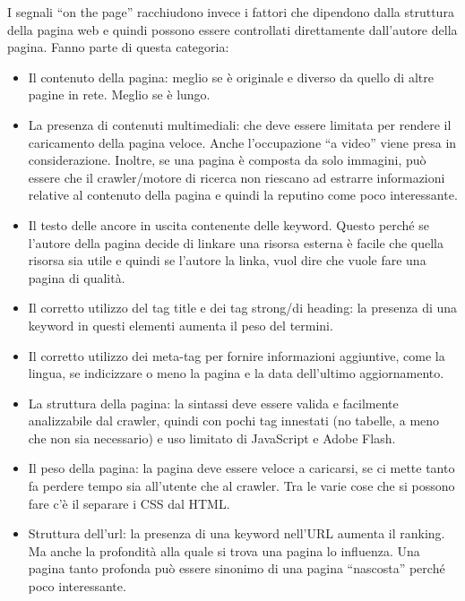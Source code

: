 I segnali ``on the page'' racchiudono invece i fattori che dipendono dalla struttura della pagina web e quindi possono essere controllati direttamente dall'autore della pagina.
Fanno parte di questa categoria:

\begin{itemize}
	\item Il contenuto della pagina: meglio se è originale e diverso da quello di altre pagine in rete. Meglio se è lungo.
	\item La presenza di contenuti multimediali: che deve essere limitata per rendere il caricamento della pagina veloce. Anche l'occupazione ``a video'' viene presa in considerazione. Inoltre, se una pagina è composta da solo immagini, può essere che il crawler/motore di ricerca non riescano ad estrarre informazioni relative al contenuto della pagina e quindi la reputino come poco interessante.
	\item Il testo delle ancore in uscita contenente delle keyword. Questo perché se l'autore della pagina decide di linkare una risorsa esterna è facile che quella risorsa sia utile e quindi se l'autore la linka, vuol dire che vuole fare una pagina di qualità.
	\item Il corretto utilizzo del tag title e dei tag strong/di heading: la presenza di una keyword in questi elementi aumenta il peso del termini.
	\item Il corretto utilizzo dei meta-tag per fornire informazioni aggiuntive, come la lingua, se indicizzare o meno la pagina e la data dell'ultimo aggiornamento.
	\item La struttura della pagina: la sintassi deve essere valida e facilmente analizzabile dal crawler, quindi con pochi tag innestati (no tabelle, a meno che non sia necessario) e uso limitato di JavaScript e Adobe Flash.
	\item Il peso della pagina: la pagina deve essere veloce a caricarsi, se ci mette tanto fa perdere tempo sia all'utente che al crawler. Tra le varie cose che si possono fare c'è il separare i CSS dal HTML.
	\item Struttura dell'url: la presenza di una keyword nell'URL aumenta il ranking. Ma anche la profondità alla quale si trova una pagina lo influenza. Una pagina tanto profonda può essere sinonimo di una pagina ``nascosta'' perché poco interessante.
\end{itemize}











